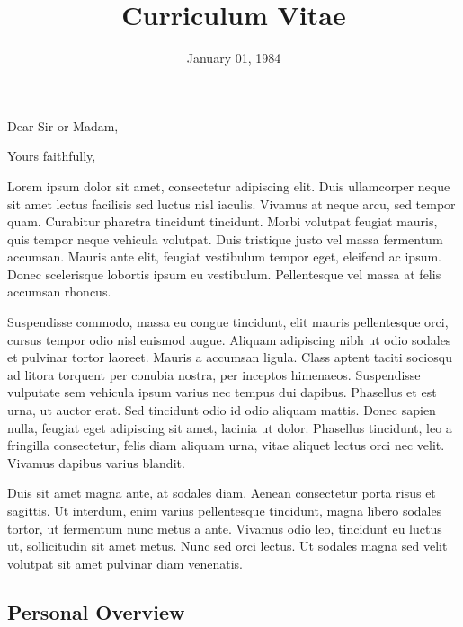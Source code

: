 \documentclass[11pt,letterpaper,sans]{moderncv} %
\title{Curriculum Vitae}
\begin{document}
\date{January 01, 1984}
\opening{Dear Sir or Madam,}
\closing{Yours faithfully,}

\makelettertitle
Lorem ipsum dolor sit amet, consectetur adipiscing elit. Duis ullamcorper neque sit amet lectus facilisis sed luctus nisl iaculis. Vivamus at neque arcu, sed tempor quam. Curabitur pharetra tincidunt tincidunt. Morbi volutpat feugiat mauris, quis tempor neque vehicula volutpat. Duis tristique justo vel massa fermentum accumsan. Mauris ante elit, feugiat vestibulum tempor eget, eleifend ac ipsum. Donec scelerisque lobortis ipsum eu vestibulum. Pellentesque vel massa at felis accumsan rhoncus.

Suspendisse commodo, massa eu congue tincidunt, elit mauris pellentesque orci, cursus tempor odio nisl euismod augue. Aliquam adipiscing nibh ut odio sodales et pulvinar tortor laoreet. Mauris a accumsan ligula. Class aptent taciti sociosqu ad litora torquent per conubia nostra, per inceptos himenaeos. Suspendisse vulputate sem vehicula ipsum varius nec tempus dui dapibus. Phasellus et est urna, ut auctor erat. Sed tincidunt odio id odio aliquam mattis. Donec sapien nulla, feugiat eget adipiscing sit amet, lacinia ut dolor. Phasellus tincidunt, leo a fringilla consectetur, felis diam aliquam urna, vitae aliquet lectus orci nec velit. Vivamus dapibus varius blandit.

Duis sit amet magna ante, at sodales diam. Aenean consectetur porta risus et sagittis. Ut interdum, enim varius pellentesque tincidunt, magna libero sodales tortor, ut fermentum nunc metus a ante. Vivamus odio leo, tincidunt eu luctus ut, sollicitudin sit amet metus. Nunc sed orci lectus. Ut sodales magna sed velit volutpat sit amet pulvinar diam venenatis.

\makeletterclosing

\clearpage

\makecvtitle{}




\subsection{Personal Overview}
\end{document}
